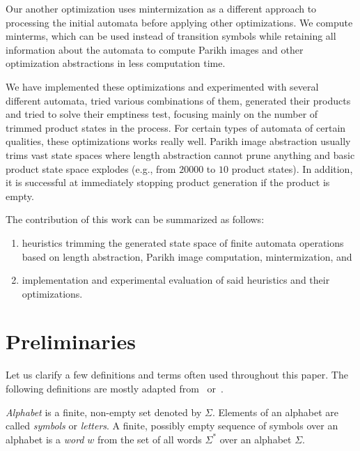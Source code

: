 
Our another optimization uses mintermization as a different approach to processing the initial automata before applying other optimizations. We compute minterms, which can be used instead of transition symbols while retaining all information about the automata to compute Parikh images and other optimization abstractions in less computation time.


We have implemented these optimizations and experimented with several different automata, tried various combinations of them, generated their products and tried to solve their emptiness test, focusing mainly on the number of trimmed product states in the process. For certain types of automata of certain qualities, these optimizations works really well. Parikh image abstraction usually trims vast state spaces where length abstraction cannot prune anything and basic product state space explodes (e.g., from $20000$ to $10$ product states). In addition, it is successful at immediately stopping product generation if the product is empty.

The contribution of this work can be summarized as follows:
\begin{enumerate}
    \item heuristics trimming the generated state space of finite automata operations based on length abstraction, Parikh image computation, mintermization, and
    \item implementation and experimental evaluation of said heuristics and their optimizations.
\end{enumerate}


\chapter{Preliminaries}
Let us clarify a few definitions and terms often used throughout this paper. The following definitions are mostly adapted from~\cite{Esparza} or~\cite{Sipser}.

\emph{Alphabet} is a finite, non-empty set denoted by $\Sigma$. Elements of an alphabet are called \emph{symbols} or \emph{letters}. A finite, possibly empty sequence of symbols over an alphabet is a \emph{word} $w$ from the set of all words $\Sigma^*$ over an alphabet $\Sigma$.

